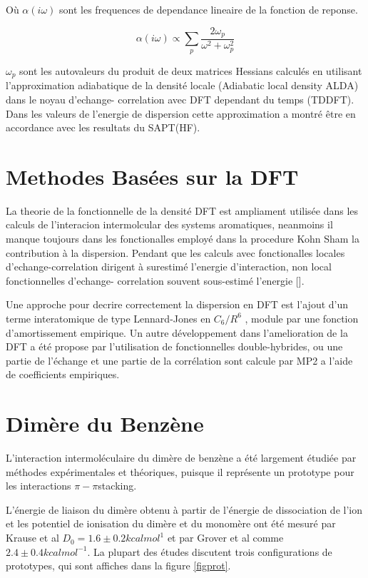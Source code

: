  Où $\alpha(i\omega)$ sont les frequences de dependance lineaire de la fonction de reponse. 
 
 \begin{equation}
 \alpha(i\omega) \propto \sum_{p} \frac{2\omega_{p}}{\omega^{2} + \omega_{p}^{2}}  \label{ome}
 \end{equation}
 
 $\omega_{p}$ sont les autovaleurs du produit de deux matrices Hessians calculés en utilisant l'approximation adiabatique de la densité locale (Adiabatic local density ALDA)\cite{gross1996density} dans le noyau d'echange- correlation avec DFT dependant du temps (TDDFT). Dans les valeurs de l'energie de dispersion cette approximation a montré être en accordance avec les resultats du SAPT(HF). 
 
 \section{Methodes Basées sur la DFT} 
 
 La theorie de la fonctionnelle de la densité DFT est ampliament utilisée dans les calculs de l'interacion intermolcular des systems aromatiques, neanmoins il manque toujours dans les fonctionalles employé dans la procedure Kohn Sham la contribution à la dispersion. Pendant que les calculs avec fonctionalles locales d'echange-correlation dirigent à surestimé l'energie d'interaction, non local fonctionnelles d'echange- correlation souvent sous-estimé l'energie [].
 
 Une approche pour decrire correctement la dispersion en DFT est l’ajout d’un terme interatomique de type Lennard-Jones en $C_{6}/R^{6}$ , module par une fonction d’amortissement empirique. Un autre développement dans l’amelioration de la DFT a été propose par l’utilisation de fonctionnelles double-hybrides, ou une partie de l’échange et une partie de la corrélation sont calcule par MP2 a l’aide de coefficients empiriques.
 
 \section{Dimère du Benzène}
 
 L'interaction intermoléculaire du dimère de benzène a été largement étudiée par méthodes  expérimentales et théoriques, puisque il représente un prototype pour les interactions $\pi-\pi$stacking.
 
 L'énergie de liaison du dimère obtenu à partir de l'énergie de dissociation de l'ion et les potentiel de ionisation du dimère et du monomère ont été mesuré par Krause et al \cite{krause1991binding} $D_{0}= 1.6 \pm 0.2 kcal mol^{1}$ et par Grover et al \cite{grover1987dissociation} comme $2.4 \pm 0.4 kcal mol^{-1}$. La plupart des études discutent trois configurations de prototypes, qui sont affiches dans la figure \ref{figprot}.
 
